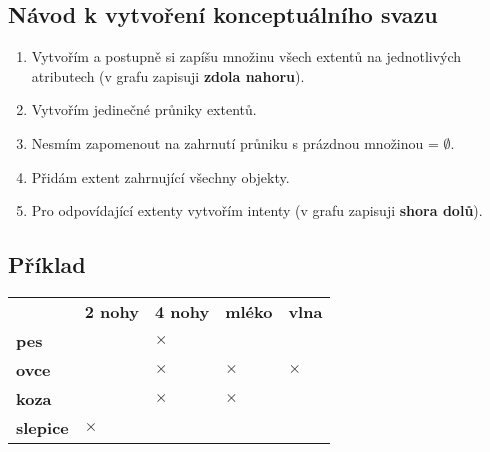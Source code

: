 \subsection{Návod k vytvoření konceptuálního svazu}
\begin{enumerate}
    \item Vytvořím a postupně si zapíšu množinu všech extentů na jednotlivých atributech (v grafu zapisuji \textbf{zdola nahoru}).
    \item Vytvořím jedinečné průniky extentů.
    \item Nesmím zapomenout na zahrnutí průniku s prázdnou množinou = $\emptyset$.
    \item Přidám extent zahrnující všechny objekty.
    \item Pro odpovídající extenty vytvořím intenty (v grafu zapisuji \textbf{shora dolů}).
\end{enumerate}

\subsection*{Příklad}
\begin{table}[H]
    \centering
    \begin{tabular}{l|l|l|l|l}
                         & \textbf{2 nohy} & \textbf{4 nohy} & \textbf{mléko} & \textbf{vlna} \\\hhline
        \textbf{pes}     &                 & $\times$        &                &               \\
        \textbf{ovce}    &                 & $\times$        & $\times$       & $\times$      \\
        \textbf{koza}    &                 & $\times$        & $\times$       &               \\
        \textbf{slepice} & $\times$        &                 &                &               \\
    \end{tabular}
\end{table}


